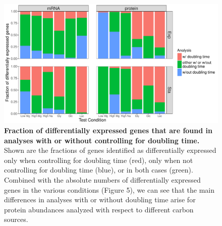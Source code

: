 \documentclass[a4paper]{article}
\begin{document}
\clearpage
\begin{figure}[!htb]
	\includegraphics[width=1\textwidth]{../../c_figures/difference_rtw_GrowthControl.pdf}
	\caption[Fraction of differentially expressed genes that are found in analyses with or without controlling for doubling time]
	{\textbf{Fraction of differentially expressed genes that are found in analyses with or without controlling for doubling time.} Shown are the fractions of genes identified as differentially expressed only when controlling for doubling time (red), only when not controlling for doubling time (blue), or in both cases (green). Combined with the absolute numbers of differentially expressed genes in the various conditions (Figure 5), we can see that the main differences in analyses with or without doubling time arise for protein abundances analyzed with respect to different carbon sources.}
\end{figure}
\end{document}
